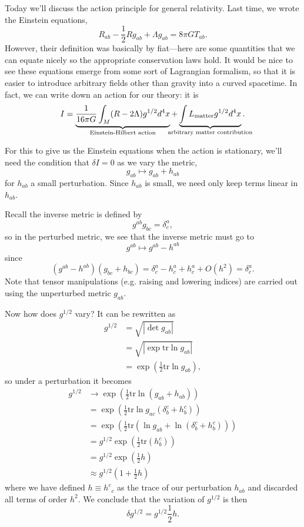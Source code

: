 Today we'll discuss the action principle for general relativity. Last time, we wrote the Einstein equations,
$$R_{ab}-\frac{1}{2}Rg_{ab}+\Lambda g_{ab}=8\pi GT_{ab}.$$
%
However, their definition was basically by fiat---here are some quantities that we can equate nicely so the appropriate conservation laws hold. It would be nice to see these equations emerge from some sort of Lagrangian formalism, so that it is easier to introduce arbitrary fields other than gravity into a curved spacetime. In fact, we can write down an action for our theory: it is
\begin{equation}
    I=\underbrace{\frac{1}{16\pi G}\int_M (R-2\Lambda)g^{1/2}d^4x}_{\text{Einstein-Hilbert action}} + \underbrace{\int L_\text{matter} g^{1/2}d^4x}_{\mathclap{\text{arbitrary matter contribution}}}.
\end{equation}

For this to give us the Einstein equations when the action is stationary, we'll need the condition that $\delta I=0$ as we vary the metric,
$$g_{ab}\mapsto g_{ab}+h_{ab}$$ for $h_{ab}$ a small perturbation. Since $h_{ab}$ is small, we need only keep terms linear in $h_{ab}$. 

Recall the inverse metric is defined by
$$g^{ab} g_{bc}=\delta^a_c,$$ %
so in the perturbed metric, we see that the inverse metric must go to 
$$g^{ab}\mapsto g^{ab}-h^{ab}$$ since
$$(g^{ab}-h^{ab})(g_{bc}+h_{bc})=\delta^a_c -h^a_c+h^a_c+O(h^2)=\delta^a_c.$$
Note that tensor manipulations (e.g. raising and lowering indices) are carried out using the unperturbed metric $g_{ab}$.

Now how does $g^{1/2}$ vary? It can be rewritten as
\begin{align*}
    g^{1/2}&= \sqrt{|\det g_{ab}|}\\
    &=\sqrt{|\exp \text{tr}\ln g_{ab}|}\\
    &=\exp \left(\frac{1}{2} \text{tr}\ln g_{ab}\right),
\end{align*}
so under a perturbation it becomes
\begin{align*}
g^{1/2}&\to \exp \left(\frac{1}{2}\text{tr}\ln (g_{ab}+h_{ab})\right)\\
&=\exp \left(\frac{1}{2} \text{tr} \ln g_{ac} (\delta^c_b + h^c_b)\right)\\
&=\exp \left(\frac{1}{2}\text{tr}(\ln g_{ab}+\ln (\delta^c_b +h^c_b))\right)\\
&= g^{1/2} \exp \left(\frac{1}{2} \text{tr}(h^c_b)\right)\\
&=g^{1/2} \exp \left(\frac{1}{2} h\right)\\
&\approx g^{1/2} \left(1+\frac{1}{2}h\right)
\end{align*}
where we have defined $h\equiv h^c{}_c$ as the trace of our perturbation $h_{ab}$ and discarded all terms of order $h^2$. We conclude that the variation of $g^{1/2}$ is then
\begin{equation}
    \delta g^{1/2}=g^{1/2}\frac{1}{2}h.
\end{equation}

